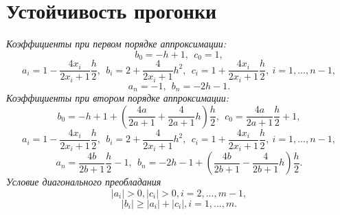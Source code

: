\documentclass[a4paper,12pt]{article}
\begin{document}
\section{\normalsize{Устойчивость прогонки}}
\begin{flushleft}
  \textit{Коэффициенты при первом порядке аппроксимации:}
  \begin{equation}\label{eq:koef11}
    b_0 = -h + 1,~~c_0 = 1,
  \end{equation}
  \begin{equation}\label{eq:koef12}
    a_i = 1 - \frac{4x_i}{2x_i+1}\frac{h}{2},~~b_i=2+\frac{4}{2x_i+1}h^2,~~c_i=1+\frac{4x_i}{2x_i+1}\frac{h}{2},~i=1,...,n-1,
  \end{equation}
  \begin{equation}\label{eq:koef13}
    a_n=-1,~~b_n=-2h-1.
  \end{equation}
  \textit{Коэффициенты при втором порядке аппроксимации:}
  \begin{equation}\label{eq:koef21}
    b_0 = -h + 1 + (\frac{4a}{2a+1}+\frac{4}{2a+1}h)\frac{h}{2},~~c_0 = \frac{4a}{2a+1}\frac{h}{2} + 1,
  \end{equation}
  \begin{equation}\label{eq:koef22}
    a_i = 1 - \frac{4x_i}{2x_i+1}\frac{h}{2},~~b_i=2+\frac{4}{2x_i+1}h^2,~~c_i=1+\frac{4x_i}{2x_i+1}\frac{h}{2},~i=1,...,n-1,
  \end{equation}
  \begin{equation}\label{eq:koef23}
    a_n=\frac{4b}{2b+1}\frac{h}{2}-1,~~b_n=-2h-1+(\frac{4b}{2b+1}-\frac{4}{2b+1}h)\frac{h}{2}.
  \end{equation}
  \textit{Условие диагонального преобладания}
  \begin{equation}\label{eq:diagsup}
    \mathopen| a_i \mathclose| > 0, \mathopen| c_i \mathclose| > 0, i = 2,...,m-1,
  \end{equation}
  \begin{equation*}
    \mathopen| b_i \mathclose| \ge \mathopen| a_i \mathclose| + \mathopen| c_i \mathclose|, i = 1, ...,m.
  \end{equation*}
\end{flushleft}
\end{document}
